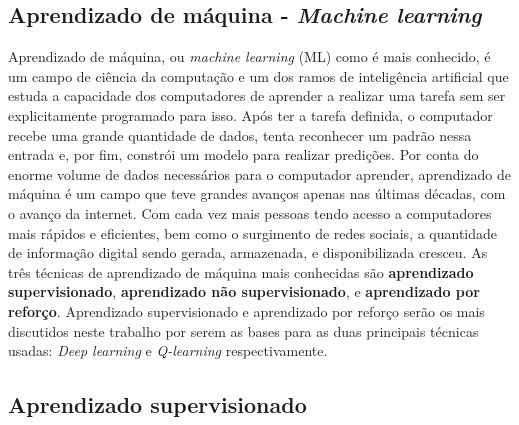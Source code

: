 \subsection{Aprendizado de máquina - \textit{Machine learning}}
\label{sec:ml}
Aprendizado de máquina, ou \textit{machine learning} (ML) como é mais conhecido, é um campo de ciência da computação e um dos ramos de inteligência artificial que estuda a capacidade dos computadores de aprender a realizar uma tarefa sem ser explicitamente programado para isso. Após ter a tarefa definida, o computador recebe uma grande quantidade de dados, tenta reconhecer um padrão nessa entrada e, por fim, constrói um modelo para realizar predições.
Por conta do enorme volume de dados necessários para o computador aprender, aprendizado de máquina é um campo que teve grandes avanços apenas nas últimas décadas, com o avanço da internet. Com cada vez mais pessoas tendo acesso a computadores mais rápidos e eficientes, bem como o surgimento de redes sociais, a quantidade de informação digital sendo gerada, armazenada, e disponibilizada cresceu.
As três técnicas de aprendizado de máquina mais conhecidas são \textbf{aprendizado supervisionado}, \textbf{aprendizado não supervisionado}, e \textbf{aprendizado por reforço}.
Aprendizado supervisionado e aprendizado por reforço serão os mais discutidos neste trabalho por serem as bases para as duas principais técnicas usadas: \textit{Deep learning} e \textit{Q-learning} respectivamente.

\subsection{Aprendizado supervisionado}
\label{sec:sl}


